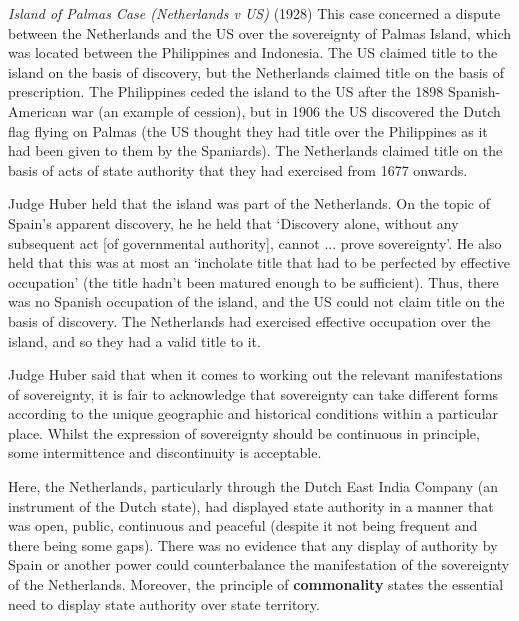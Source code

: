 \begin{casedetails}{\textit{Island of Palmas Case (Netherlands v US)} (1928)}
    \flushleft
    This case concerned a dispute between the Netherlands and the US over the sovereignty of Palmas Island, which was located between the Philippines and Indonesia. The US claimed title to the island on the basis of discovery, but the Netherlands claimed title on the basis of prescription. The Philippines ceded the island to the US after the 1898 Spanish-American war (an example of cession), but in 1906 the US discovered the Dutch flag flying on Palmas (the US thought they had title over the Philippines as it had been given to them by the Spaniards). The Netherlands claimed title on the basis of acts of state authority that they had exercised from 1677 onwards.

    \vspace{\baselineskip}

    Judge Huber held that the island was part of the Netherlands. On the topic of Spain's apparent discovery, he he held that `Discovery alone, without any subsequent act [of governmental authority], cannot ... prove sovereignty'. He also held that this was at most an `incholate title that had to be perfected by effective occupation' (the title hadn't been matured enough to be sufficient). Thus, there was no Spanish occupation of the island, and the US could not claim title on the basis of discovery. The Netherlands had exercised effective occupation over the island, and so they had a valid title to it.

    \vspace{\baselineskip}

    Judge Huber said that when it comes to working out the relevant manifestations of sovereignty, it is fair to acknowledge that sovereignty can take different forms according to the unique geographic and historical conditions within a particular place. Whilst the expression of sovereignty should be continuous in principle, some intermittence and discontinuity is acceptable.

    \vspace{\baselineskip}

    Here, the Netherlands, particularly through the Dutch East India Company (an instrument of the Dutch state), had displayed state authority in a manner that was open, public, continuous and peaceful (despite it not being frequent and there being some gaps). There was no evidence that any display of authority by Spain or another power could counterbalance the manifestation of the sovereignty of the Netherlands. Moreover, the principle of \textbf{commonality} states the essential need to display state authority over state territory.


\end{casedetails}
